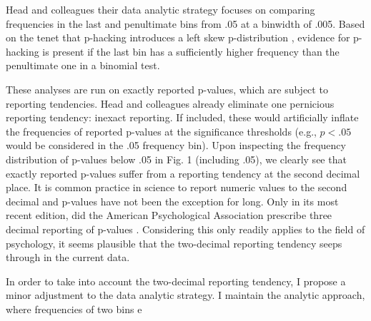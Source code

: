 Head and colleagues their data analytic strategy focuses on comparing frequencies in the last and penultimate bins from .05 at a binwidth of .005. Based on the tenet that p-hacking introduces a left skew p-distribution \cite{Simonsohn2014}, evidence for p-hacking is present if the last bin has a sufficiently higher frequency than the penultimate one in a binomial test. 

These analyses are run on exactly reported p-values, which are subject to reporting tendencies. Head and colleagues already eliminate one pernicious reporting tendency: inexact reporting. If included, these would artificially inflate the frequencies of reported p-values at the significance thresholds (e.g., $p<.05$ would be considered in the .05 frequency bin). Upon inspecting the frequency distribution of p-values below .05 in Fig. 1 (including .05), we clearly see that exactly reported p-values suffer from a reporting tendency at the second decimal place. It is common practice in science to report numeric values to the second decimal and p-values have not been the exception for long. Only in its most recent edition, did the American Psychological Association prescribe three decimal reporting of p-values \cite{AmericanPsychologicalAssociation2010}. Considering this only readily applies to the field of psychology, it seems plausible that the two-decimal reporting tendency seeps through in the current data. 

In order to take into account the two-decimal reporting tendency, I propose a minor adjustment to the data analytic strategy. I maintain the analytic approach, where frequencies of two bins e